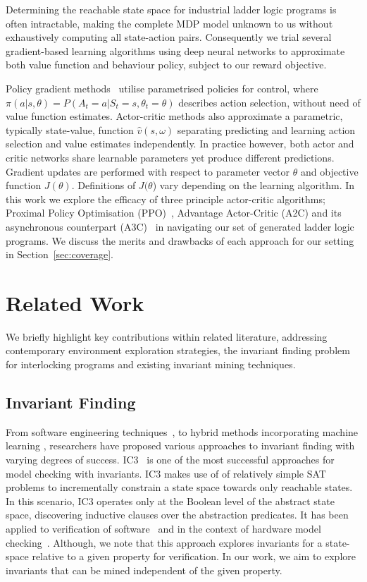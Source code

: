 \documentclass[runningheads]{llncs}
\begin{document}
Determining the reachable state space for industrial ladder logic programs is often intractable, making the complete MDP model unknown to us without exhaustively computing all state-action pairs. Consequently we trial several gradient-based learning algorithms using deep neural networks to approximate both value function and behaviour policy, subject to our reward objective. 

Policy gradient methods~\cite{kakade2001natural} utilise parametrised policies for control, where $\pi(a|s,\theta) = P(A_t=a|S_t=s,\theta_t=\theta)$ describes action selection, without need of value function estimates. Actor-critic methods also approximate a parametric, typically state-value, function $\hat{v}(s,\omega)$ separating predicting and learning action selection and value estimates independently. In practice however, both actor and critic networks share learnable parameters yet produce different predictions. Gradient updates are performed with respect to parameter vector $\theta$ and objective function $J(\theta)$. Definitions of $J(\theta$) vary depending on the learning algorithm. In this work we explore the efficacy of three principle actor-critic algorithms; Proximal Policy Optimisation (PPO)~\cite{schulman2017proximal}, Advantage Actor-Critic (A2C) and its asynchronous counterpart (A3C)~\cite{mnih2016asynchronous} in navigating our set of generated ladder logic programs. We discuss the merits and drawbacks of each approach for our setting in Section~\ref{sec:coverage}.

\section{Related Work}
We briefly highlight key contributions within related literature, addressing contemporary environment exploration strategies, the invariant finding problem for interlocking programs and existing invariant mining techniques.

\subsection{Invariant Finding}
From software engineering techniques~\cite{case2007automated, bensalem1996powerful}, to hybrid methods incorporating machine learning \cite{garg2016learning}, researchers have proposed various approaches to invariant finding with varying degrees of success. 
IC3~\cite{bradley11} is one of the most successful approaches for model checking with invariants. IC3 makes use of of relatively simple SAT problems to incrementally constrain a state space towards only reachable states. In this scenario, IC3 operates only at the Boolean level of the abstract state space, discovering inductive clauses over the abstraction predicates. It has been applied to verification of software~\cite{cimatti12} and in the context of hardware model checking~\cite{bradley07}. Although, we note that this approach explores invariants for a state-space relative to a given property for verification. In our work, we aim to explore invariants that can be mined independent of the given property.
\end{document}
